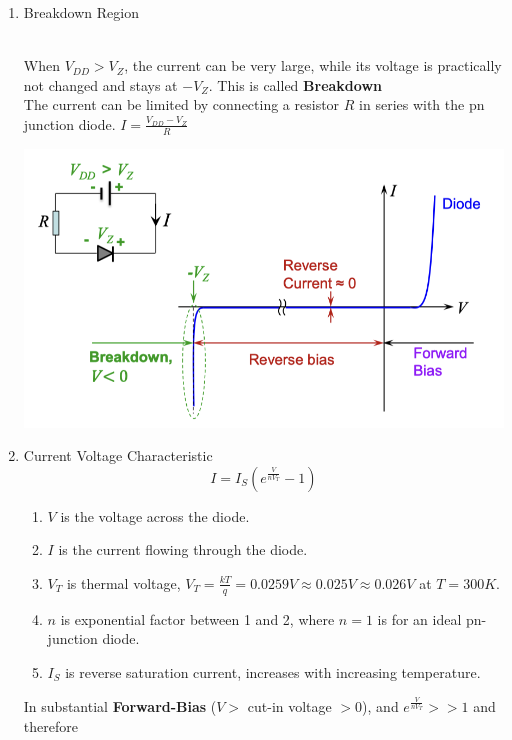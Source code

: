 \documentclass{article}
\begin{document}
\begin{enumerate}
\begin{minipage}{0.6\textwidth}
    \end{minipage}
    \item Breakdown Region\\
    \\
    \begin{minipage}{0.4\textwidth}
        When $\displaystyle V_{DD} > V_Z$, the current can be very large, while its voltage is practically not changed and stays at $-V_Z$. This is called \textbf{Breakdown}\\
        The current can be limited by connecting a resistor $R$ in series with the pn junction diode. $\displaystyle I = \frac{V_{DD}-V_Z}{R}$
    \end{minipage}
    \begin{minipage}{0.6\textwidth}
        \includegraphics[width=1\linewidth]{image/breakdownregion.png}
    \end{minipage}
    \item Current Voltage Characteristic
    \[I = I_S(e^{\frac{V}{nV_T}}-1)\]
    \begin{enumerate}
        \item $V$ is the voltage across the diode.
        \item  $I$ is the current flowing through the diode.
        \item $V_T$ is thermal voltage, $\displaystyle V_T = \frac{kT}{q} = 0.0259V \approx 0.025V \approx 0.026V$ at $T = 300K$.
        \item $n$ is exponential factor between 1 and 2, where $n = 1$ is for an ideal pn-junction diode.
        \item $I_S$ is reverse saturation current, increases with increasing temperature.
    \end{enumerate}
    In substantial \textbf{Forward-Bias} ($V>$ cut-in voltage $> 0$), and $\displaystyle e^{\frac{V}{nV_T}} >> 1$ and therefore

\end{enumerate}
\end{document}
